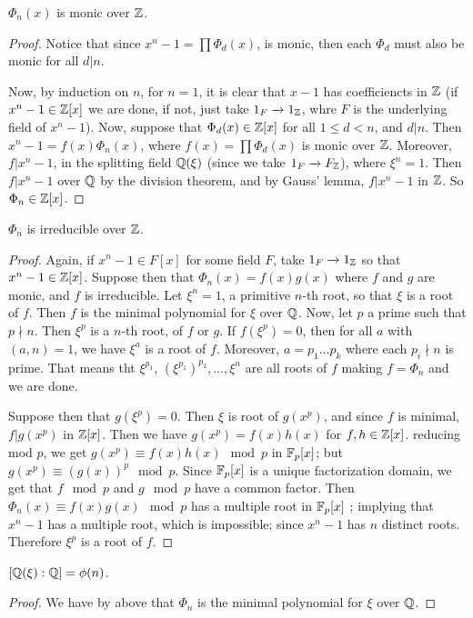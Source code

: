 \begin{lemma}\label{lemma_8.7.3}
  $\Phi_n(x)$ is monic over $\mathbb{Z}$.
\end{lemma}
\begin{proof}
  Notice that since $x^n-1=\prod{\Phi_d(x)}$, is monic, then each $\Phi_d$
  must also be monic for all  $d|n$.

  Now, by induction on $n$, for  $n=1$, it is clear that  $x-1$ has
  coefficiencts in  $\mathbb{Z}$  (if $x^n-1 \in \mathbb{Z}[x]$ we are done, if not, just take
  $1_F \xrightarrow{} 1_{\mathbb{Z}}$, whre $F$ is the underlying field of  $x^n-1$).
  Now, suppose that $\Phi_d(x) \in \mathbb{Z}[x]$ for all $1 \leq d <n$, and  $d|n$.
  Then  $x^n-1=f(x)\Phi_n(x)$, where $f(x)=\prod{\Phi_d(x)}$ is monic over
  $\mathbb{Z}$. Moreover,  $f|x^n-1$, in the splitting field $\mathbb{Q}(\xi)$ (since we take
  $1_F \xrightarrow{} F_{\mathbb{Z}}$), where $\xi^n=1$. Then  $f|x^n-1$ over  $\mathbb{Q}$ by
  the division theorem, and by Gauss' lemma, $f|x^n-1$ in $\mathbb{Z}$. So $\Phi_n \in
  \mathbb{Z}[x]$.
\end{proof}

\begin{theorem}\label{lemma_8.7.4}
  $\Phi_n$ is irreducible over  $\mathbb{Z}$.
\end{theorem}
\begin{proof}
  Again, if $x^n-1 \in F[x]$ for some field $F$, take  $1_F \xrightarrow{}
  1_{\mathbb{Z}}$ so that $x^n-1 \in \mathbb{Z}[x]$. Suppose then that $\Phi_n(x)=f(x)g(x)$
  where $f$ and  $g$ are monic, and  $f$ is irreducible. Let $\xi^n=1$, a
  primitive $n$-th root, so that $\xi$ is a root of $f$. Then $f$ is the
  minimal polynomial for $\xi$ over  $\mathbb{Q}$. Now, let $p$ a prime such that $p
  \nmid n$. Then $\xi^p$ is a $n$-th root, of $f$ or $g$. If  $f(\xi^p)=0$,
  then for all $a$ with  $(a,n)=1$, we have $\xi^a$ is a root of $f$.
  Moreover,  $a=p_1 \dots p_k$ where each $p_i \nmid n$ is prime. That means
  tht  $\xi^{p_1}$, $(\xi^{p_1})^{p_2}, \dots, \xi^n$ are all roots of $f$
  making  $f=\Phi_n$ and we are done.

  Suppose then that $g(\xi^p)=0$. Then $\xi$ is root of  $g(x^p)$,
  and since $f$ is minimal, $f|g(x^p)$ in $\mathbb{Z}[x]$. Then we have
  $g(x^p)=f(x)h(x)$ for $f,h \in \mathbb{Z}[x]$. reducing mod $p$, we get
  $g(x^p) \equiv f(x)h(x) \mod{p}$ in $\mathbb{F}_p[x]$; but $g(x^p) \equiv (g(x))^p
  \mod{p}$. Since $\mathbb{F}_p[x]$ is a unique factorization domain, we get that $f
  \mod{p}$ and $g \mod{p}$ have a common factor. Then $\Phi_n(x) \equiv
  f(x)g(x) \mod{p}$ has a multiple root in $\mathbb{F}_p[x]$ ; implying that $x^n-1$
  has a multiple root, which is impossible; since $x^n-1$ has  $n$ distinct
  roots. Therefore $\xi^p$ is a root of  $f$.
\end{proof}
\begin{corollary}
  $[\mathbb{Q}(\xi):\mathbb{Q}]=\phi(n)$.
\end{corollary}
\begin{proof}
  We have by above that $\Phi_n$ is the minimal polynomial for  $\xi$ over
  $\mathbb{Q}$.
\end{proof}

